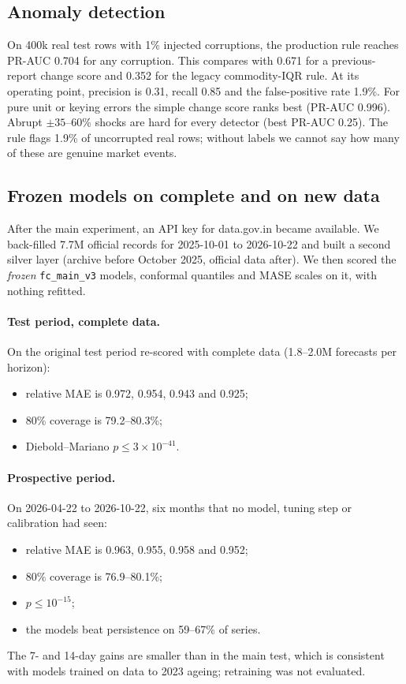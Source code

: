 \subsection{Anomaly detection}
On 400k real test rows with 1\% injected corruptions, the production rule reaches PR-AUC 0.704 for any corruption.
This compares with 0.671 for a previous-report change score and 0.352 for the legacy commodity-IQR rule.
At its operating point, precision is 0.31, recall 0.85 and the false-positive rate 1.9\%.
For pure unit or keying errors the simple change score ranks best (PR-AUC 0.996).
Abrupt $\pm35$--60\% shocks are hard for every detector (best PR-AUC 0.25).
The rule flags 1.9\% of uncorrupted real rows; without labels we cannot say how many of these are genuine market events.

\subsection{Frozen models on complete and on new data}\label{sec:prospective}
After the main experiment, an API key for data.gov.in became available.
We back-filled \num{7.7}M official records for 2025-10-01 to 2026-10-22 and built a second silver layer (archive before October 2025, official data after).
We then scored the \emph{frozen} \texttt{fc\_main\_v3} models, conformal quantiles and MASE scales on it, with nothing refitted.

\paragraph{Test period, complete data.}
On the original test period re-scored with complete data (1.8--2.0M forecasts per horizon):
\begin{itemize}
  \item relative MAE is 0.972, 0.954, 0.943 and 0.925;
  \item 80\% coverage is 79.2--80.3\%;
  \item Diebold--Mariano $p\le3\times10^{-41}$.
\end{itemize}

\paragraph{Prospective period.}
On 2026-04-22 to 2026-10-22, six months that no model, tuning step or calibration had seen:
\begin{itemize}
  \item relative MAE is 0.963, 0.955, 0.958 and 0.952;
  \item 80\% coverage is 76.9--80.1\%;
  \item $p\le10^{-15}$;
  \item the models beat persistence on 59--67\% of series.
\end{itemize}
The 7- and 14-day gains are smaller than in the main test, which is consistent with models trained on data to 2023 ageing; retraining was not evaluated.

